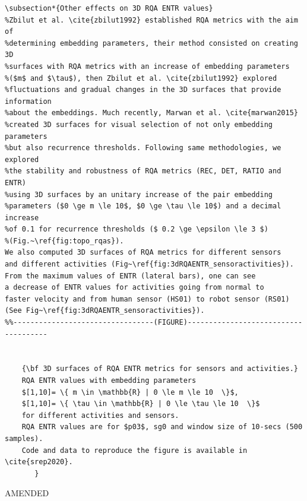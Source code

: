 \documentclass[10pt]{article}
\begin{document}
\begin{enumerate}
\begin{verbatim}
\subsection*{Other effects on 3D RQA ENTR values}
%Zbilut et al. \cite{zbilut1992} established RQA metrics with the aim of 
%determining embedding parameters, their method consisted on creating 3D 
%surfaces with RQA metrics with an increase of embedding parameters 
%($m$ and $\tau$), then Zbilut et al. \cite{zbilut1992} explored 
%fluctuations and gradual changes in the 3D surfaces that provide information 
%about the embeddings. Much recently, Marwan et al. \cite{marwan2015} 
%created 3D surfaces for visual selection of not only embedding parameters 
%but also recurrence thresholds. Following same methodologies, we explored 
%the stability and robustness of RQA metrics (REC, DET, RATIO and ENTR)
%using 3D surfaces by an unitary increase of the pair embedding 
%parameters ($0 \ge m \le 10$, $0 \ge \tau \le 10$) and a decimal increase 
%of 0.1 for recurrence thresholds ($ 0.2 \ge \epsilon \le 3 $) 
%(Fig.~\ref{fig:topo_rqas}). 
We also computed 3D surfaces of RQA metrics for different sensors 
and different activities (Fig~\ref{fig:3dRQAENTR_sensoractivities}).
From the maximum values of ENTR (lateral bars), one can see 
a decrease of ENTR values for activities going from normal to 
faster velocity and from human sensor (HS01) to robot sensor (RS01) 
(See Fig~\ref{fig:3dRQAENTR_sensoractivities}). 
%%---------------------------------(FIGURE)-------------------------------------


	{\bf 3D surfaces of RQA ENTR metrics for sensors and activities.}
	RQA ENTR values with embedding parameters
	$[1,10]= \{ m \in \mathbb{R} | 0 \le m \le 10  \}$,
	$[1,10]= \{ \tau \in \mathbb{R} | 0 \le \tau \le 10  \}$
	for different activities and sensors. 
	RQA ENTR values are for $p03$, sg0 and window size of 10-secs (500 samples).
	Code and data to reproduce the figure is available in \cite{srep2020}.
       }

\end{verbatim}

AMENDED
\begin{verbatim}



\end{verbatim}
\end{enumerate}
\end{document}
